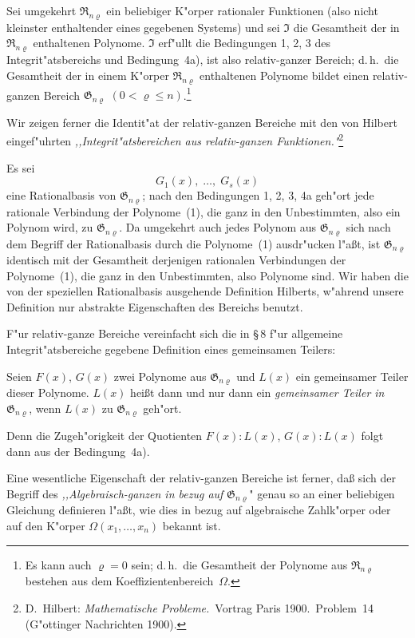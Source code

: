 \documentclass[11pt,a4paper]{article}
\begin{document}
Sei umgekehrt $\mathfrak{R}_{n\varrho}$ ein beliebiger K"{o}rper rationaler Funktionen
(also nicht kleinster enthaltender eines gegebenen Systems) und sei $\mathfrak{I}$
die Gesamtheit der in $\mathfrak{R}_{n\varrho}$ enthaltenen Polynome. $\mathfrak{I}$ erf"{u}llt die Bedingungen
1, 2, 3 des Integrit"{a}tsbereichs und Bedingung~4a), ist also relativ-ganzer
Bereich; d.\,h.\ die Gesamtheit der in einem K"{o}rper $\mathfrak{R}_{n\varrho}$ enthaltenen Polynome
bildet einen relativ-ganzen Bereich $\mathfrak{G}_{n\varrho}$ $(0<\varrho\le n)$.\footnote{Es kann auch
$\varrho=0$ sein; d.\,h.\ die Gesamtheit der Polynome aus $\mathfrak{R}_{n\varrho}$ bestehen aus dem
Koeffizientenbereich~$\Omega$.}

Wir zeigen ferner die Identit"{a}t der relativ-ganzen Bereiche mit den
von Hilbert eingef"{u}hrten \emph{,,Integrit"{a}tsbereichen aus relativ-ganzen Funktionen."{}}\footnote{D.~Hilbert:
\emph{Mathematische Probleme.}\ Vortrag Paris 1900.\ Problem~14 (G"{o}ttinger
Nachrichten 1900).}

Es sei
\begin{equation}
G_{1}(x),\;\dots,\;G_{s}(x)
\tag{1}
\end{equation}
eine Rationalbasis von $\mathfrak{G}_{n\varrho}$; nach den Bedingungen 1, 2, 3, 4a geh"{o}rt
jede rationale Verbindung der Polynome~(1), die ganz in den Unbestimmten,
also ein Polynom wird, zu $\mathfrak{G}_{n\varrho}$. Da umgekehrt auch jedes Polynom aus
$\mathfrak{G}_{n\varrho}$ sich nach dem Begriff der Rationalbasis durch die Polynome~(1)
ausdr"{u}cken l"{a}\ss{}t, ist $\mathfrak{G}_{n\varrho}$ identisch mit der Gesamtheit derjenigen
rationalen Verbindungen der Polynome~(1), die ganz in den Unbestimmten,
also Polynome sind. Wir haben die von der speziellen Rationalbasis
ausgehende Definition Hilberts, w"{a}hrend unsere Definition nur abstrakte
Eigenschaften des Bereichs benutzt.

F"{u}r relativ-ganze Bereiche vereinfacht sich die in \S\,8 f"{u}r allgemeine
Integrit"{a}tsbereiche gegebene Definition eines gemeinsamen Teilers:

Seien $F(x)$, $G(x)$ zwei Polynome aus $\mathfrak{G}_{n\varrho}$ und $L(x)$ ein gemeinsamer
Teiler dieser Polynome. $L(x)$ hei\ss{}t dann und nur dann ein \emph{gemeinsamer
Teiler in} $\mathfrak{G}_{n\varrho}$, wenn $L(x)$ zu $\mathfrak{G}_{n\varrho}$ geh"{o}rt.

Denn die Zugeh"{o}rigkeit der Quotienten $F(x):L(x)$, $G(x):L(x)$ folgt
dann aus der Bedingung~4a).

Eine wesentliche Eigenschaft der relativ-ganzen Bereiche ist ferner,
da\ss{} sich der Begriff des \emph{,,Algebraisch-ganzen in bezug auf} $\mathfrak{G}_{n\varrho}$"{} genau so
an einer beliebigen Gleichung definieren l"{a}\ss{}t, wie dies in bezug auf
algebraische Zahlk"{o}rper oder auf den K"{o}rper $\Omega(x_{1},\dots,x_{n})$ bekannt ist.
\end{document}
